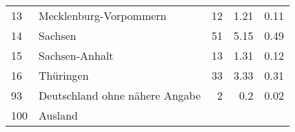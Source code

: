\begin{longtable}{lXrrr}
     13 &
     \multicolumn{1}{X}{ Mecklenburg-Vorpommern   } &


       \num{12} &
       \num[round-mode=places,round-precision=2]{1,21} &
         \num[round-mode=places,round-precision=2]{0,11} \\

     14 &
     \multicolumn{1}{X}{ Sachsen   } &


       \num{51} &
       \num[round-mode=places,round-precision=2]{5,15} &
         \num[round-mode=places,round-precision=2]{0,49} \\

     15 &
     \multicolumn{1}{X}{ Sachsen-Anhalt   } &


       \num{13} &
       \num[round-mode=places,round-precision=2]{1,31} &
         \num[round-mode=places,round-precision=2]{0,12} \\

     16 &
     \multicolumn{1}{X}{ Thüringen   } &


       \num{33} &
       \num[round-mode=places,round-precision=2]{3,33} &
         \num[round-mode=places,round-precision=2]{0,31} \\

     93 &
     \multicolumn{1}{X}{ Deutschland ohne nähere Angabe   } &


       \num{2} &
       \num[round-mode=places,round-precision=2]{0,2} &
         \num[round-mode=places,round-precision=2]{0,02} \\

     100 &
     \multicolumn{1}{X}{ Ausland   } &



\end{longtable}
